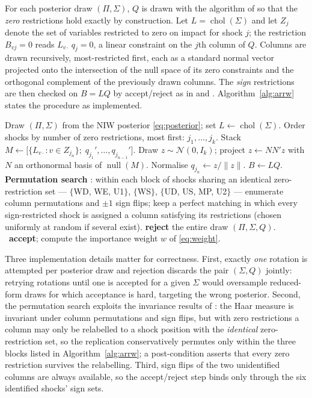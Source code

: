 For each posterior draw $(\Pi, \Sigma)$, $Q$ is drawn with the algorithm of \citet{arias2018} so that the \emph{zero} restrictions hold exactly by construction. Let $L = \operatorname{chol}(\Sigma)$ and let $Z_j$ denote the set of variables restricted to zero on impact for shock $j$; the restriction $B_{vj} = 0$ reads $L_{v\cdot}\, q_j = 0$, a linear constraint on the $j$th column of $Q$. Columns are drawn recursively, most-restricted first, each as a standard normal vector projected onto the intersection of the null space of its zero constraints and the orthogonal complement of the previously drawn columns. The \emph{sign} restrictions are then checked on $B = LQ$ by accept/reject as in \citet{uhlig2005} and \citet{rubioramirez2010}. Algorithm~\ref{alg:arrw} states the procedure as implemented.

\begin{algorithm}[t]
\caption{Zero-and-sign-restriction sampler (one candidate per posterior draw)}
\label{alg:arrw}
\begin{algorithmic}[1]
\State Draw $(\Pi, \Sigma)$ from the NIW posterior \eqref{eq:posterior}; set $L \gets \operatorname{chol}(\Sigma)$.
\State Order shocks by number of zero restrictions, most first: $j_1, \ldots, j_k$.
  \State Stack $M \gets \big[\{L_{v\cdot} : v \in Z_{j_n}\};\; q_{j_1}', \ldots, q_{j_{n-1}}'\big]$.
  \State Draw $z \sim \mathcal{N}(0, I_k)$; project $z \gets N N' z$ with $N$ an orthonormal basis of $\operatorname{null}(M)$.
  \State Normalise $q_{j_n} \gets z / \lVert z \rVert$.
\EndFor
\State $B \gets L Q$.
\State \textbf{Permutation search} \citep{chan2025}: within each block of shocks sharing an identical zero-restriction set --- $\{$WD, WE, U1$\}$, $\{$WS$\}$, $\{$UD, US, MP, U2$\}$ --- enumerate column permutations and $\pm 1$ sign flips; keep a perfect matching in which every sign-restricted shock is assigned a column satisfying its restrictions (chosen uniformly at random if several exist).
 \textbf{reject} the entire draw $(\Pi, \Sigma, Q)$.
\Else\ \textbf{accept}; compute the importance weight $w$ of \eqref{eq:weight}.
\EndIf
\end{algorithmic}
\end{algorithm}

Three implementation details matter for correctness. First, exactly \emph{one} rotation is attempted per posterior draw and rejection discards the pair $(\Sigma, Q)$ jointly: retrying rotations until one is accepted for a given $\Sigma$ would oversample reduced-form draws for which acceptance is hard, targeting the wrong posterior. Second, the permutation search exploits the invariance results of \citet{chan2025}: the Haar measure is invariant under column permutations and sign flips, but with zero restrictions a column may only be relabelled to a shock position with the \emph{identical} zero-restriction set, so the replication conservatively permutes only within the three blocks listed in Algorithm~\ref{alg:arrw}; a post-condition asserts that every zero restriction survives the relabelling. Third, sign flips of the two unidentified columns are always available, so the accept/reject step binds only through the six identified shocks' sign sets.

